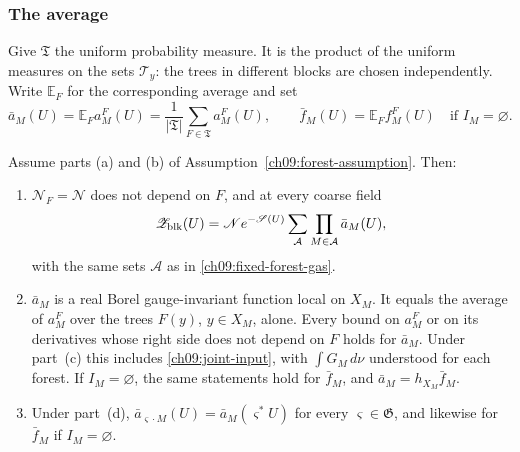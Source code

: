 \subsubsection*{The average}

Give $\mathfrak T$ the uniform probability measure. It is the product
of the uniform measures on the sets $\mathcal T_y$: the trees in
different blocks are chosen independently. Write $\mathbb E_F$ for the
corresponding average and set
\begin{equation}
 \bar a_M(U)=\mathbb E_Fa_M^F(U)
   =\frac1{|\mathfrak T|}\sum_{F\in\mathfrak T}a_M^F(U),
 \qquad
 \bar f_M(U)=\mathbb E_Ff_M^F(U)\quad\text{if }I_M=\varnothing .
 \label{ch09:averaged-activity}
\end{equation}

\begin{proposition}
\label{ch09:forest-average-prop}
Assume parts \textup{(a)} and \textup{(b)} of
Assumption~\ref{ch09:forest-assumption}. Then:
\begin{enumerate}[label=\textup{(\roman*)}]
\item $\mathscr N_F=\mathscr N$ does not depend on $F$, and at every
 coarse field
 \begin{equation}
  \mathscr Z_{\rm blk}(U)=\mathscr Ne^{-\mathscr S(U)}
   \sum_{\mathcal A}\prod_{M\in\mathcal A}\bar a_M(U),
  \label{ch09:averaged-gas}
 \end{equation}
 with the same sets $\mathcal A$ as in \eqref{ch09:fixed-forest-gas}.
\item $\bar a_M$ is a real Borel gauge-invariant function local on
 $X_M$. It equals the average of $a_M^F$ over the trees $F(y)$,
 $y\in X_M$, alone. Every bound on $a_M^F$ or on its derivatives
 whose right side does not depend on $F$ holds for $\bar a_M$. Under
 part~\textup{(c)} this includes \eqref{ch09:joint-input}, with
 $\int G_M\,d\nu$ understood for each forest. If $I_M=\varnothing$,
 the same statements hold for $\bar f_M$, and
 $\bar a_M=h_{X_M}\bar f_M$.
\item Under part~\textup{(d)},
 $\bar a_{\varsigma\cdot M}(U)=\bar a_M(\varsigma^*U)$ for every
 $\varsigma\in\mathfrak G$, and likewise for $\bar f_M$ if
 $I_M=\varnothing$.
\end{enumerate}
\end{proposition}

